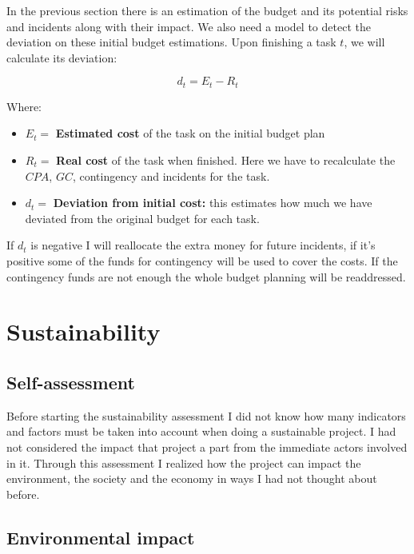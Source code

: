 In the previous section there is an estimation of the budget and its potential risks and
incidents along with their impact. We also need a model to detect the
deviation on these initial budget estimations. Upon finishing a task $t$, we will
calculate its deviation:

\begin{equation}
    d_t = E_t - R_t
\end{equation}

Where:

\begin{itemize}
    \item $E_t = $ \textbf{Estimated cost} of the task on the initial budget
        plan
    \item $R_t = $ \textbf{Real cost} of the task when finished. Here we have to
        recalculate the $CPA$, $GC$, contingency and incidents for the task.
    \item $d_t = $ \textbf{Deviation from initial cost:} this estimates how much
        we have deviated from the original budget for each task.
\end{itemize}

If $d_t$ is negative I will reallocate the extra money for future incidents, if
it's positive some of the funds for contingency will be used to cover the costs.
If the contingency funds are not enough the whole budget planning will be
readdressed.

\pagebreak
\section{Sustainability}%
\label{sec:sustainability}

\subsection{Self-assessment}

Before starting the sustainability assessment I did not know how many indicators
and factors must be taken into account when doing a sustainable project. I had
not considered the impact that project a part from the immediate actors involved
in it. Through this assessment I realized how the project can impact the
environment, the society and the economy in ways I had not thought about before.

\subsection{Environmental impact}

